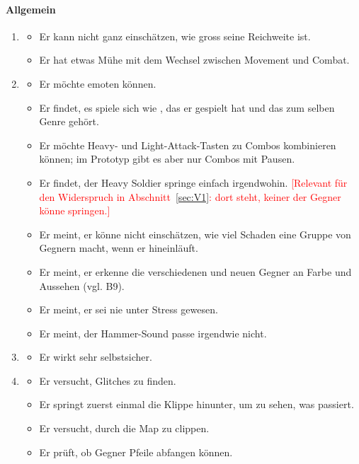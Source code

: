 \documentclass[../Main.tex]{subfiles}
\begin{document}
\paragraph{Allgemein}
\begin{enumerate}[label=\textbf{B\arabic*}, leftmargin=1.5cm, itemsep=0.8em, resume]
\item
\begin{itemize}[nosep]
\item Er kann nicht ganz einschätzen, wie gross seine Reichweite ist.
\item Er hat etwas Mühe mit dem Wechsel zwischen Movement und Combat.
\end{itemize}
\item
\begin{itemize}[nosep]
\item Er möchte emoten können.
\item Er findet, es spiele sich wie , das er gespielt hat und das zum selben Genre gehört.
\item Er möchte Heavy- und Light-Attack-Tasten zu Combos kombinieren können; im Prototyp gibt es aber nur Combos mit Pausen.
\item Er findet, der Heavy Soldier springe einfach irgendwohin. \textcolor{red}{[Relevant für den Widerspruch in Abschnitt~\ref{sec:V1}: dort steht, keiner der Gegner könne springen.]}
\item Er meint, er könne nicht einschätzen, wie viel Schaden eine Gruppe von Gegnern macht, wenn er hineinläuft.
\item Er meint, er erkenne die verschiedenen und neuen Gegner an Farbe und Aussehen (vgl. B9).
\item Er meint, er sei nie unter Stress gewesen.
\item Er meint, der Hammer-Sound passe irgendwie nicht.
\end{itemize}
\item
\begin{itemize}[nosep]
\item Er wirkt sehr selbstsicher.
\end{itemize}
\item
\begin{itemize}[nosep]
\item Er versucht, Glitches zu finden.
\item Er springt zuerst einmal die Klippe hinunter, um zu sehen, was passiert.
\item Er versucht, durch die Map zu clippen.
\item Er prüft, ob Gegner Pfeile abfangen können.

\end{itemize}
\end{enumerate}
\end{document}
